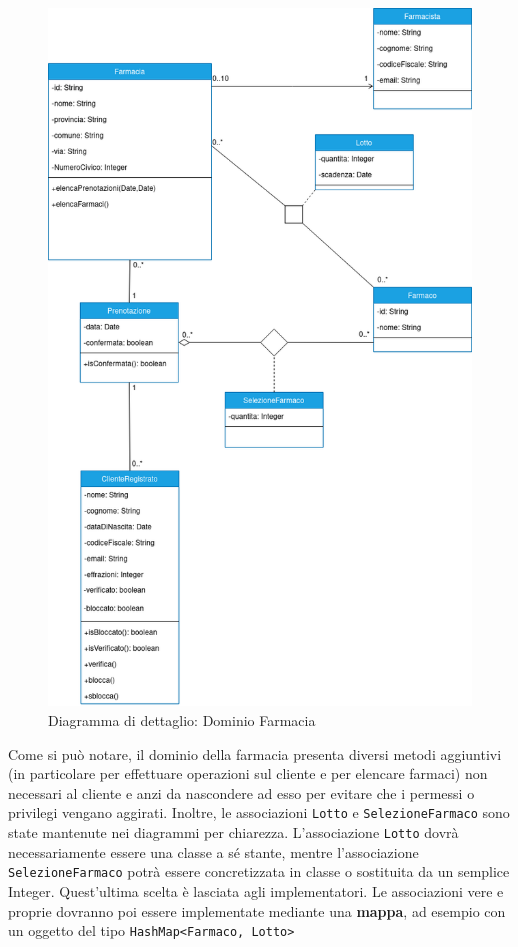 \begin{figure}[h!]
    \begin{center}
        \includegraphics[scale=0.56]{immagini/DominioFarmacia-progettazione.png}
        \caption{Diagramma di dettaglio: Dominio Farmacia}
    \end{center}
\end{figure}

\newpage

Come si può notare, il dominio della farmacia presenta diversi metodi aggiuntivi (in particolare per effettuare operazioni sul cliente e per elencare farmaci)
non necessari al cliente e anzi da nascondere ad esso per evitare che i permessi o privilegi vengano aggirati.
Inoltre, le associazioni \texttt{Lotto} e \texttt{SelezioneFarmaco} sono state mantenute nei diagrammi per chiarezza. 
L'associazione \texttt{Lotto} dovrà necessariamente essere una classe a sé stante,
mentre l'associazione \texttt{SelezioneFarmaco} potrà essere concretizzata in classe o sostituita da un semplice Integer. Quest'ultima scelta è lasciata agli implementatori.
Le associazioni vere e proprie dovranno poi essere implementate mediante una \textbf{mappa}, ad esempio con un oggetto del tipo \mbox{\texttt{HashMap<Farmaco, Lotto>}}


